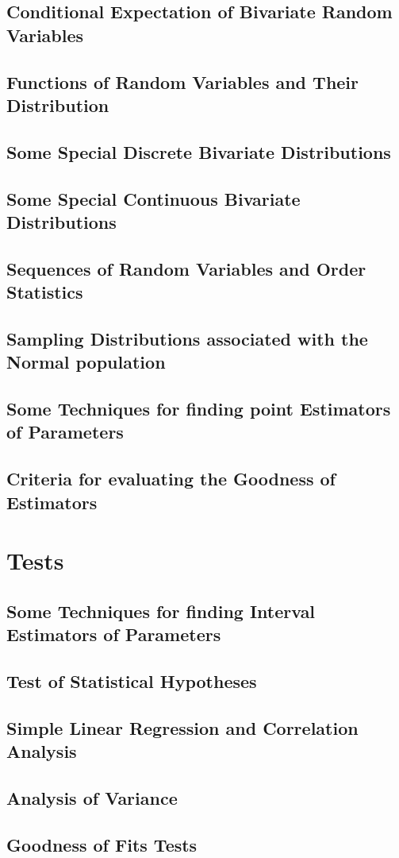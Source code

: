 \documentclass[a4paper, 10pt]{scrbook}  %
\begin{document}
\chapter{Conditional Expectation of Bivariate Random Variables}

\chapter{Functions of Random Variables and Their Distribution}

\chapter{Some Special Discrete Bivariate Distributions}

\chapter{Some Special Continuous Bivariate Distributions}

\chapter{Sequences of Random Variables and Order Statistics}

\chapter{Sampling Distributions associated with the Normal population}

\chapter{Some Techniques for finding point Estimators of Parameters}

\chapter{Criteria for evaluating the Goodness of Estimators}

\part{Tests}
\chapter{Some Techniques for finding Interval Estimators of Parameters}

\chapter{Test of Statistical Hypotheses}

\chapter{Simple Linear Regression and Correlation Analysis}

\chapter{Analysis of Variance}

\chapter{Goodness of Fits Tests}

\end{document}
